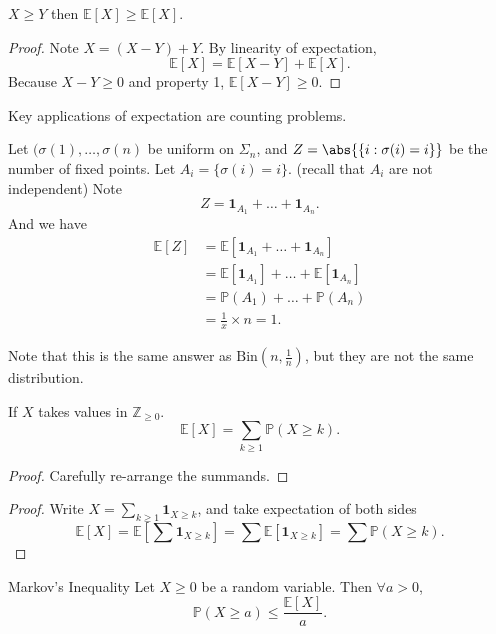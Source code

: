\begin{corollary}{}{}
    \(X \geq Y\) then \(\mathbb{E}[X] \geq \mathbb{E}[X]\).
\end{corollary}
\begin{proof}
    Note \(X = (X - Y) + Y\). By linearity of expectation,
    \[
        \mathbb{E}[X] = \mathbb{E}[X - Y] + \mathbb{E}[X].
    \]
    Because \(X - Y \geq 0\) and property 1, \(\mathbb{E}[X - Y] \geq 0\).
\end{proof}
Key applications of expectation are counting problems.

\begin{example}
    Let \((\sigma(1), \dots, \sigma(n)\) be uniform on \(\Sigma_n\), and \(Z = \abs{\{i : \sigma(i) = i\}}\) be the number of fixed points. Let \(A_i = \{\sigma(i) = i\}\). (recall that \(A_i\) are not independent) Note
    \[
        Z = \mathbf{1}_{A_1} + \dots + \textbf{1}_{A_n}.
    \]
    And we have
    \begin{align*}
        \mathbb{E}[Z] &= \mathbb{E}[\textbf{1}_{A_1} + \dots + \textbf{1}_{A_n}]\\
        &= \mathbb{E}[\textbf{1}_{A_1}] + \dots + \mathbb{E}[\textbf{1}_{A_n}]\\
        &= \mathbb{P}(A_1) + \dots + \mathbb{P}(A_n)\\
        &= \frac{1}{x}\times n = 1.
    \end{align*}

    Note that this is the same answer as \(\mathrm{Bin}(n, \frac{1}{n})\), but they are not the same distribution.
\end{example}
\begin{example}
    If \(X\) takes values in \(\mathbb{Z}_{\geq 0}\).
    \[
        \mathbb{E}[X] = \sum_{k \geq 1} \mathbb{P}(X\geq k).
    \]
    \begin{proof}
        Carefully re-arrange the summands.
    \end{proof}
    \begin{proof}
        Write \(X = \sum_{k\geq 1}\textbf{1}_{X \geq k}\), and take expectation of both sides
        \[
            \mathbb{E}[X] = \mathbb{E}[\sum \textbf{1}_{X \geq k}] = \sum \mathbb{E}[\textbf{1}_{X \geq k}] = \sum \mathbb{P}(X \geq k).
        \]
    \end{proof}
\end{example}
\begin{theorem}{Markov's Inequality}{}
    Let \(X \geq 0\) be a random variable. Then \(\forall a > 0\),
    \[
        \mathbb{P}(X \geq a) \leq \frac{\mathbb{E}[X]}{a}.
    \]
\end{theorem}
